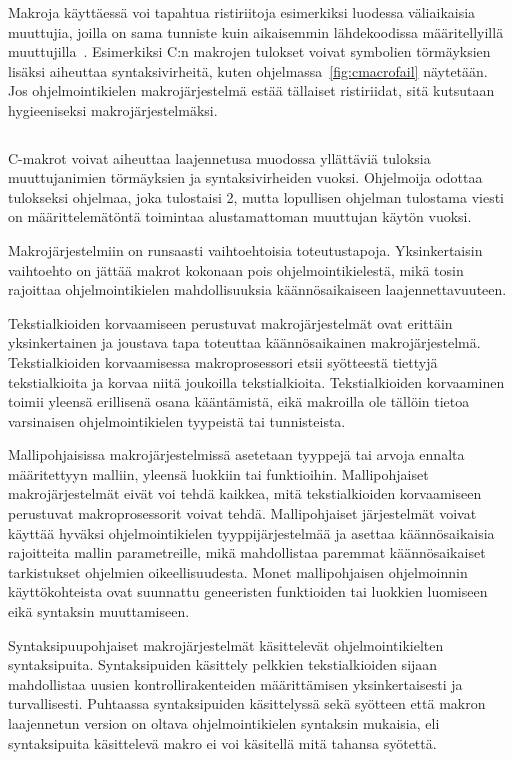 Makroja käyttäessä voi tapahtua ristiriitoja esimerkiksi luodessa väliaikaisia
muuttujia, joilla on sama tunniste kuin aikaisemmin lähdekoodissa
määritellyillä muuttujilla~\citep{macrohygiene}. Esimerkiksi C:n makrojen
tulokset voivat symbolien törmäyksien lisäksi aiheuttaa syntaksivirheitä, kuten
ohjelmassa~\ref{fig:cmacrofail} näytetään. Jos ohjelmointikielen
makrojärjestelmä estää tällaiset ristiriidat, sitä kutsutaan hygieeniseksi
makrojärjestelmäksi.

\begin{listing}[ht!]
    \inputminted{C}{koodi/cmacrofail.c}
    \caption{C-makrot voivat aiheuttaa laajennetusa muodossa yllättäviä
    tuloksia muuttujanimien törmäyksien ja syntaksivirheiden vuoksi. Ohjelmoija
    odottaa tulokseksi ohjelmaa, joka tulostaisi 2, mutta lopullisen ohjelman
    tulostama viesti on määrittelemätöntä toimintaa alustamattoman muuttujan
    käytön vuoksi.}
    \label{fig:cmacrofail}
\end{listing}

Makrojärjestelmiin on runsaasti vaihtoehtoisia toteutustapoja. Yksinkertaisin
vaihtoehto on jättää makrot kokonaan pois ohjelmointikielestä, mikä tosin
rajoittaa ohjelmointikielen mahdollisuuksia käännösaikaiseen
laajennettavuuteen.

Tekstialkioiden korvaamiseen perustuvat makrojärjestelmät ovat erittäin
yksinkertainen ja joustava tapa toteuttaa käännösaikainen makrojärjestelmä.
Tekstialkioiden korvaamisessa makroprosessori etsii syötteestä tiettyjä
tekstialkioita ja korvaa niitä joukoilla tekstialkioita. Tekstialkioiden
korvaaminen toimii yleensä erillisenä osana kääntämistä, eikä makroilla ole
tällöin tietoa varsinaisen ohjelmointikielen tyypeistä tai tunnisteista.

Mallipohjaisissa makrojärjestelmissä asetetaan tyyppejä tai arvoja ennalta
määritettyyn malliin, yleensä luokkiin tai funktioihin. Mallipohjaiset
makrojärjestelmät eivät voi tehdä kaikkea, mitä tekstialkioiden korvaamiseen
perustuvat makroprosessorit voivat tehdä. Mallipohjaiset järjestelmät voivat
käyttää hyväksi ohjelmointikielen tyyppijärjestelmää ja asettaa käännösaikaisia
rajoitteita mallin parametreille, mikä mahdollistaa paremmat käännösaikaiset
tarkistukset ohjelmien oikeellisuudesta. Monet mallipohjaisen ohjelmoinnin
käyttökohteista ovat suunnattu geneeristen funktioiden tai luokkien luomiseen
eikä syntaksin muuttamiseen.

Syntaksipuupohjaiset makrojärjestelmät käsittelevät ohjelmointikielten
syntaksipuita. Syntaksipuiden käsittely pelkkien tekstialkioiden sijaan
mahdollistaa uusien kontrollirakenteiden määrittämisen yksinkertaisesti ja
turvallisesti. Puhtaassa syntaksipuiden käsittelyssä sekä syötteen että makron
laajennetun version on oltava ohjelmointikielen syntaksin mukaisia, eli
syntaksipuita käsittelevä makro ei voi käsitellä mitä tahansa syötettä.

